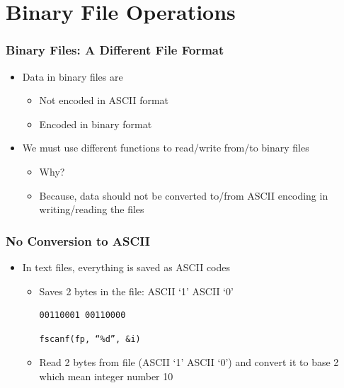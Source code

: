 \documentclass{../c-lecture}
\begin{document}
\section{Binary File Operations}

\begin{frame}
  \frametitle{Binary Files: A Different File Format}
  \begin{itemize}
    \item Data in binary files are
    \begin{itemize}
      \item Not encoded in ASCII format
      \item Encoded in binary format
    \end{itemize}
    \item We must use different functions to read/write from/to binary files
    \begin{itemize}
      \item Why?
      \item
        Because, data should not be converted to/from ASCII encoding in
        writing/reading the files

    \end{itemize}
  \end{itemize}
\end{frame}

\begin{frame}[fragile]
  \frametitle{No Conversion to ASCII}
  \begin{itemize}
    \item In text files, everything is saved as ASCII codes
    \begin{itemize}
      \begin{verbatim}
fprintf(fp, “%d”, 10)
      \end{verbatim}
      \item Saves 2 bytes in the file: ASCII ‘1’ ASCII ‘0’
      \begin{verbatim}
00110001 00110000
      \end{verbatim}
      \begin{verbatim}
fscanf(fp, “%d”, &i)
      \end{verbatim}
      \item
        Read 2 bytes from file (ASCII ‘1’ ASCII ‘0’) and convert it to base 2
        which mean integer number 10
    \end{itemize}
  \end{itemize}
\end{frame}
\end{document}
